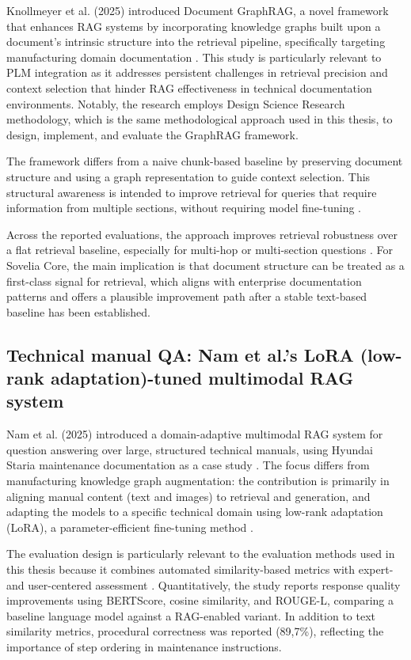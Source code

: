 Knollmeyer et al. (2025) introduced Document GraphRAG, a novel framework that enhances RAG systems by incorporating knowledge graphs built upon a document's intrinsic structure into the retrieval pipeline, specifically targeting manufacturing domain documentation \parencite{knollmeyerDocumentGraphRAGKnowledge2025}. This study is particularly relevant to PLM integration as it addresses persistent challenges in retrieval precision and context selection that hinder RAG effectiveness in technical documentation environments. Notably, the research employs Design Science Research methodology, which is the same methodological approach used in this thesis, to design, implement, and evaluate the GraphRAG framework.

The framework differs from a naive chunk-based baseline by preserving document structure and using a graph representation to guide context selection. This structural awareness is intended to improve retrieval for queries that require information from multiple sections, without requiring model fine-tuning \parencite{knollmeyerDocumentGraphRAGKnowledge2025}.

Across the reported evaluations, the approach improves retrieval robustness over a flat retrieval baseline, especially for multi-hop or multi-section questions \parencite{knollmeyerDocumentGraphRAGKnowledge2025}. For Sovelia Core, the main implication is that document structure can be treated as a first-class signal for retrieval, which aligns with enterprise documentation patterns and offers a plausible improvement path after a stable text-based baseline has been established.

\subsection*{Technical manual QA: Nam et al.'s LoRA (low-rank adaptation)-tuned multimodal RAG system}

Nam et al. (2025) introduced a domain-adaptive multimodal RAG system for question answering over large, structured technical manuals, using Hyundai Staria maintenance documentation as a case study \parencite{namLoRATunedMultimodalRAG2025}. The focus differs from manufacturing knowledge graph augmentation: the contribution is primarily in aligning manual content (text and images) to retrieval and generation, and adapting the models to a specific technical domain using low-rank adaptation (LoRA), a parameter-efficient fine-tuning method \parencite{HuEdward2022LLAO}.

The evaluation design is particularly relevant to the evaluation methods used in this thesis because it combines automated similarity-based metrics with expert- and user-centered assessment \parencite{namLoRATunedMultimodalRAG2025}. Quantitatively, the study reports response quality improvements using BERTScore, cosine similarity, and ROUGE-L, comparing a baseline language model against a RAG-enabled variant. In addition to text similarity metrics, procedural correctness was reported (89,7\%), reflecting the importance of step ordering in maintenance instructions.

